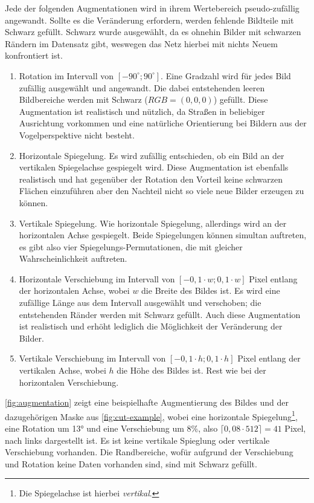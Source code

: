 Jede der folgenden Augmentationen wird in ihrem Wertebereich pseudo-zufällig angewandt. Sollte es die Veränderung 
erfordern, werden fehlende Bildteile mit Schwarz gefüllt. Schwarz wurde ausgewählt, da es ohnehin Bilder mit 
schwarzen Rändern im Datensatz gibt, weswegen das Netz hierbei mit nichts Neuem konfrontiert ist. 
\begin{enumerate}
	\item Rotation im Intervall von $[-90^\circ ; 90^\circ ]$. Eine Gradzahl wird für jedes Bild zufällig ausgewählt und angewandt. 
	Die dabei entstehenden leeren Bildbereiche werden mit Schwarz ($RGB = (0,0,0)$) gefüllt. 
	Diese Augmentation ist realistisch und nützlich, da Straßen in beliebiger Ausrichtung vorkommen und 
	eine natürliche Orientierung bei Bildern aus der Vogelperspektive nicht besteht.
	\item Horizontale Spiegelung. Es wird zufällig entschieden, ob ein Bild an der vertikalen Spiegelachse gespiegelt wird. 
	Diese Augmentation ist ebenfalls realistisch und hat gegenüber der Rotation den Vorteil keine schwarzen Flächen 
	einzuführen aber den Nachteil nicht so viele neue Bilder erzeugen zu können. 
	\item Vertikale Spiegelung. Wie horizontale Spiegelung, allerdings wird an der horizontalen Achse gespiegelt. 
	Beide Spiegelungen können simultan auftreten, es gibt also vier Spiegelungs-Permutationen, 
	die mit gleicher Wahrscheinlichkeit auftreten.
	\item Horizontale Verschiebung im Intervall von $[-0,1 \cdot w; 0,1 \cdot w]$ Pixel entlang der horizontalen Achse,
	wobei $w$ die Breite des Bildes ist. Es wird eine zufällige Länge aus dem Intervall ausgewählt und verschoben; die 
	entstehenden Ränder werden mit Schwarz gefüllt. Auch diese Augmentation ist realistisch und erhöht lediglich 
	die Möglichkeit der Veränderung der Bilder. 
	\item Vertikale Verschiebung im Intervall von $[-0,1 \cdot h; 0,1 \cdot h]$ Pixel entlang der vertikalen Achse,
	wobei $h$ die Höhe des Bildes ist. Rest wie bei der horizontalen Verschiebung.    
\end{enumerate} 

\autoref{fig:augmentation} zeigt eine beispielhafte Augmentierung des Bildes und der dazugehörigen Maske aus \autoref{fig:cut-example},
wobei eine horizontale Spiegelung\footnote{Die Spiegelachse ist hierbei \textit{vertikal}.},
eine Rotation um 13° und eine Verschiebung um 8\%, also $\lceil 0,08 \cdot 512 \rceil = 41$ Pixel, 
nach links dargestellt ist. Es ist keine vertikale Spieglung oder vertikale Verschiebung vorhanden.
Die Randbereiche, wofür aufgrund der Verschiebung und Rotation keine Daten vorhanden sind, sind mit Schwarz gefüllt. 

